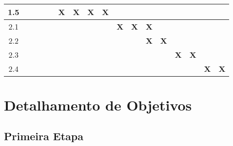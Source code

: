 \begin{table}[htb!]
\begin{tabular}{c|c|c|c|c|c|c|c|c|c|c|c|c|c|c|c|c|}
\multicolumn{1}{|c|}{1.5}             &                       &                       &                       &                       & {\bf X}               & {\bf X}               & {\bf X}               & {\bf X}               &                       &                       &                 &                 &                 &                 &                 &                 \\ \hline
\multicolumn{1}{|c|}{2.1}             &                       &                       &                       &                       &                       &                       &                       &                       & {\bf X}               & {\bf X}               & {\bf X}         &                 &                 &                 &                 &                 \\ \hline
\multicolumn{1}{|c|}{2.2}             &                       &                       &                       &                       &                       &                       &                       &                       &                       &                       & {\bf X}         & {\bf X}         &                 &                 &                 &                 \\ \hline
\multicolumn{1}{|c|}{2.3}             &                       &                       &                       &                       &                       &                       &                       &                       &                       &                       &                 &                 & {\bf X}         & {\bf X}         &                 &                 \\ \hline
\multicolumn{1}{|c|}{2.4}             &                       &                       &                       &                       &                       &                       &                       &                       &                       &                       &                 &                 &                 &                 & {\bf X}         & {\bf X}         \\ \hline
\end{tabular}
\end{table}

\section{\label{section:objectives}Detalhamento de Objetivos}

\subsection{Primeira Etapa}

